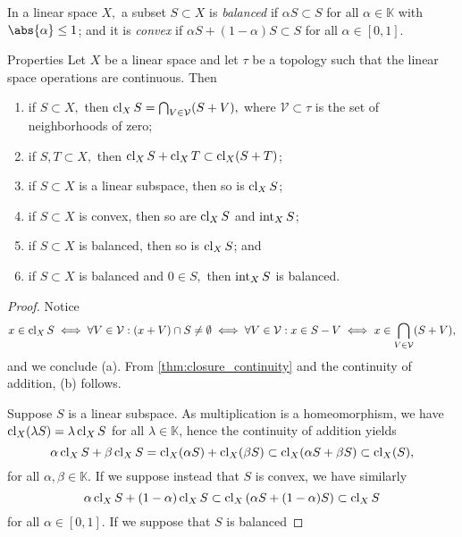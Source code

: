 In a linear space \(X,\) a subset \(S \subset X\) is \emph{balanced} if \(\alpha S \subset S\) for all \(\alpha \in \mathbb{K}\) with \(\abs{\alpha} \leq 1\); and it is \emph{convex} if \(\alpha S + (1 - \alpha) S \subset S\) for all \(\alpha \in [0,1].\) 
\begin{proposition}{Properties}{}
    Let \(X\) be a linear space and let \(\tau\) be a topology such that the linear space operations are continuous. Then
    \begin{enumerate}[label=(\alph*)]
        \item if \(S \subset X,\) then \(\operatorname{cl}_XS = \bigcap_{V \in \mathcal{V}} (S + V),\) where \(\mathcal{V} \subset \tau\) is the set of neighborhoods of zero;
        \item if \(S, T \subset X,\) then \(\operatorname{cl}_XS + \operatorname{cl}_XT \subset \operatorname{cl}_X(S + T)\);
        \item if \(S \subset X\) is a linear subspace, then so is \(\operatorname{cl}_XS\);
        \item if \(S \subset X\) is convex, then so are \(\operatorname{cl}_XS\) and \(\operatorname{int}_XS\);
        \item if \(S \subset X\) is balanced, then so is \(\operatorname{cl}_XS\); and
        \item if \(S \subset X\) is balanced and \(0 \in S,\) then \(\operatorname{int}_XS\) is balanced.
    \end{enumerate}
\end{proposition}
\begin{proof}
    Notice
    \begin{equation*}
        x \in \operatorname{cl}_XS \iff \forall V \in \mathcal{V} : (x + V) \cap S \neq \emptyset \iff \forall V \in \mathcal{V} : x \in S - V \iff x \in \bigcap_{V \in \mathcal{V}}(S + V),
    \end{equation*}
    and we conclude (a). From \cref{thm:closure_continuity} and the continuity of addition, (b) follows. 

    Suppose \(S\) is a linear subspace. As multiplication is a homeomorphism, we have \(\operatorname{cl}_X(\lambda S) = \lambda\operatorname{cl}_XS\) for all \(\lambda \in \mathbb{K}\), hence the continuity of addition yields
    \begin{equation*}
        \alpha \operatorname{cl}_XS + \beta \operatorname{cl}_XS = \operatorname{cl}_X(\alpha S) + \operatorname{cl}_X(\beta S) \subset \operatorname{cl}_X(\alpha S + \beta S) \subset \operatorname{cl}_X(S),
    \end{equation*}
    for all \(\alpha, \beta \in \mathbb{K}\). If we suppose instead that \(S\) is convex, we have similarly
    \begin{equation*}
        \alpha \operatorname{cl}_XS + (1 - \alpha) \operatorname{cl}_XS \subset \operatorname{cl}_X\left(\alpha S + (1 - \alpha) S\right) \subset \operatorname{cl}_X S
    \end{equation*}
    for all \(\alpha \in [0,1]\). If we suppose that \(S\) is balanced
\end{proof}

